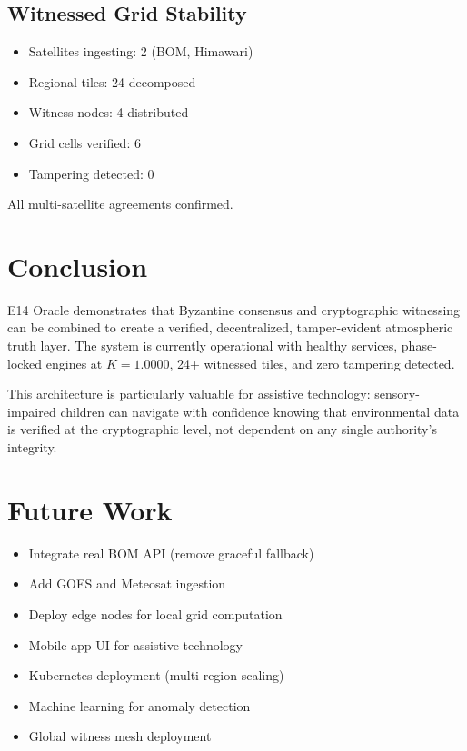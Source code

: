 \documentclass[11pt]{article}
\begin{document}
\subsection{Witnessed Grid Stability}

\begin{itemize}
    \item Satellites ingesting: 2 (BOM, Himawari)
    \item Regional tiles: 24 decomposed
    \item Witness nodes: 4 distributed
    \item Grid cells verified: 6
    \item Tampering detected: 0
\end{itemize}

All multi-satellite agreements confirmed.

\section{Conclusion}

E14 Oracle demonstrates that Byzantine consensus and cryptographic witnessing can be combined to create a verified, decentralized, tamper-evident atmospheric truth layer. The system is currently operational with healthy services, phase-locked engines at $K = 1.0000$, 24+ witnessed tiles, and zero tampering detected.

This architecture is particularly valuable for assistive technology: sensory-impaired children can navigate with confidence knowing that environmental data is verified at the cryptographic level, not dependent on any single authority's integrity.

\section{Future Work}

\begin{itemize}
    \item Integrate real BOM API (remove graceful fallback)
    \item Add GOES and Meteosat ingestion
    \item Deploy edge nodes for local grid computation
    \item Mobile app UI for assistive technology
    \item Kubernetes deployment (multi-region scaling)
    \item Machine learning for anomaly detection
    \item Global witness mesh deployment
\end{itemize}
\end{document}
